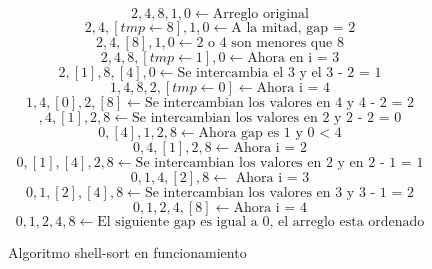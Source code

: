 \documentclass[12pt,twoside]{article}
\begin{document}
\begin{figure}[h]
    \centering
    \begin{equation}
        2,4,8,1,0 \longleftarrow \text{Arreglo original}
    \end{equation}
    \begin{equation}
        2,4,[tmp \longleftarrow 8],1,0 \longleftarrow \text{A la mitad, gap = 2}
    \end{equation}
    \begin{equation}
        2,4,[8],1,0 \longleftarrow \text{2 o 4 son menores que 8}
    \end{equation}
    \begin{equation}
        2,4,8,[tmp \longleftarrow 1],0 \longleftarrow \text{Ahora en i = 3}
    \end{equation}
    \begin{equation}
        2 , [1] , 8 , [4] , 0  \longleftarrow \text{Se intercambia el 3 y el 3 - 2 = 1}
    \end{equation}
    \begin{equation}
        1 , 4 , 8 , 2 , [tmp \longleftarrow 0]  \longleftarrow \text{Ahora i = 4}
    \end{equation}
    \begin{equation}
        1 , 4 , [0] , 2 , [8]  \longleftarrow \text{Se intercambian los valores en 4 y 4 - 2 = 2}
    \end{equation}
    \begin{equation}
        [0] , 4 , [1] , 2 , 8  \longleftarrow \text{Se intercambian los valores en 2 y 2 - 2 = 0}
    \end{equation}
    \begin{equation}
        0 , [4] , 1 , 2 , 8  \longleftarrow \text{Ahora gap es 1 y 0 < 4}
    \end{equation}
    \begin{equation}
        0 , 4 , [1] , 2 , 8  \longleftarrow \text{Ahora i = 2}
    \end{equation}
    \begin{equation}
        0 , [1] , [4] , 2 , 8  \longleftarrow \text{Se intercambian los valores en 2 y en 2 - 1 = 1}
    \end{equation}
    \begin{equation}
        0 , 1 , 4 , [2] , 8  \longleftarrow \text{ Ahora i = 3}
    \end{equation}
    \begin{equation}
        0 , 1 , [2] , [4] , 8  \longleftarrow \text{Se intercambian los valores en 3 y 3 - 1 = 2}
    \end{equation}
    \begin{equation}
        0 , 1 , 2 , 4 , [8]  \longleftarrow \text{Ahora i = 4}
    \end{equation}
    \begin{equation}
        0 , 1 , 2, 4, 8  \longleftarrow \text{El siguiente gap es igual a 0, el arreglo esta ordenado}
    \end{equation}
    \caption{Algoritmo shell-sort en funcionamiento}
    \label{eq:shell}
\end{figure}
\end{document}

